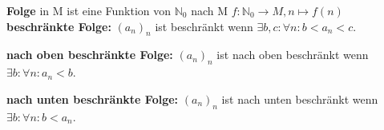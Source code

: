 \textbf{Folge} in M ist eine Funktion von $\mathbb{N}_0$ nach M $f:\mathbb{N}_0 \to M, n \mapsto f(n)$\\

\textbf{beschränkte Folge:} $(a_n)_n$ ist beschränkt wenn $\exists b,c : \forall n: b<a_n<c$.

\textbf{nach oben beschränkte Folge:} $(a_n)_n$ ist nach oben beschränkt wenn $\exists b: \forall n: a_n<b$.

\textbf{nach unten beschränkte Folge:} $(a_n)_n$ ist nach unten beschränkt wenn $\exists b: \forall n: b<a_n$.\\



